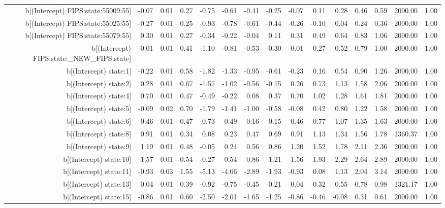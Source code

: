 \begin{table}[ht]
\begin{tabular}{rrrrrrrrrrrrrrr}
  b[(Intercept) FIPS:state:55009:55] & -0.07 & 0.01 & 0.27 & -0.75 & -0.61 & -0.41 & -0.25 & -0.07 & 0.11 & 0.28 & 0.46 & 0.59 & 2000.00 & 1.00 \\ 
  b[(Intercept) FIPS:state:55025:55] & -0.27 & 0.01 & 0.25 & -0.93 & -0.78 & -0.61 & -0.44 & -0.26 & -0.10 & 0.04 & 0.24 & 0.36 & 2000.00 & 1.00 \\ 
  b[(Intercept) FIPS:state:55079:55] & 0.30 & 0.01 & 0.27 & -0.34 & -0.22 & -0.04 & 0.11 & 0.31 & 0.49 & 0.64 & 0.83 & 1.06 & 2000.00 & 1.00 \\ 
  b[(Intercept) FIPS:state:\_NEW\_FIPS:state] & -0.01 & 0.01 & 0.41 & -1.10 & -0.81 & -0.53 & -0.30 & -0.01 & 0.27 & 0.52 & 0.79 & 1.00 & 2000.00 & 1.00 \\ 
  b[(Intercept) state:1] & -0.22 & 0.01 & 0.58 & -1.82 & -1.33 & -0.95 & -0.61 & -0.23 & 0.16 & 0.54 & 0.90 & 1.26 & 2000.00 & 1.00 \\ 
  b[(Intercept) state:2] & 0.28 & 0.01 & 0.67 & -1.57 & -1.02 & -0.56 & -0.15 & 0.26 & 0.73 & 1.13 & 1.58 & 2.06 & 2000.00 & 1.00 \\ 
  b[(Intercept) state:4] & 0.70 & 0.01 & 0.47 & -0.49 & -0.22 & 0.08 & 0.37 & 0.70 & 1.02 & 1.28 & 1.61 & 1.81 & 2000.00 & 1.00 \\ 
  b[(Intercept) state:5] & -0.09 & 0.02 & 0.70 & -1.79 & -1.41 & -1.00 & -0.58 & -0.08 & 0.42 & 0.80 & 1.22 & 1.58 & 2000.00 & 1.00 \\ 
  b[(Intercept) state:6] & 0.46 & 0.01 & 0.47 & -0.73 & -0.49 & -0.16 & 0.15 & 0.46 & 0.77 & 1.07 & 1.35 & 1.63 & 2000.00 & 1.00 \\ 
  b[(Intercept) state:8] & 0.91 & 0.01 & 0.34 & 0.08 & 0.23 & 0.47 & 0.69 & 0.91 & 1.13 & 1.34 & 1.56 & 1.78 & 1360.37 & 1.00 \\ 
  b[(Intercept) state:9] & 1.19 & 0.01 & 0.48 & -0.05 & 0.24 & 0.56 & 0.86 & 1.20 & 1.52 & 1.78 & 2.11 & 2.36 & 2000.00 & 1.00 \\ 
  b[(Intercept) state:10] & 1.57 & 0.01 & 0.54 & 0.27 & 0.54 & 0.86 & 1.21 & 1.56 & 1.93 & 2.29 & 2.64 & 2.89 & 2000.00 & 1.00 \\ 
  b[(Intercept) state:11] & -0.93 & 0.03 & 1.55 & -5.13 & -4.06 & -2.89 & -1.93 & -0.93 & 0.08 & 1.13 & 2.04 & 3.14 & 2000.00 & 1.00 \\ 
  b[(Intercept) state:13] & 0.04 & 0.01 & 0.39 & -0.92 & -0.75 & -0.45 & -0.21 & 0.04 & 0.32 & 0.55 & 0.78 & 0.98 & 1321.17 & 1.00 \\ 
  b[(Intercept) state:15] & -0.86 & 0.01 & 0.60 & -2.50 & -2.01 & -1.65 & -1.25 & -0.86 & -0.46 & -0.08 & 0.31 & 0.61 & 2000.00 & 1.00 \\ 

\end{tabular}
\end{table}
